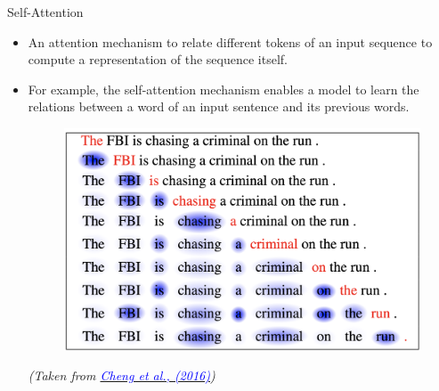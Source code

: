 \begin{frame}{Self-Attention}
\begin{itemize}
    \item  An attention mechanism to relate different tokens of an input sequence to compute a representation of the sequence itself. 
    \item For example, the self-attention mechanism enables a model to learn the relations between a word of an input sentence and its previous words. 
    \begin{figure}
        \centering
        \includegraphics[scale=0.2]{./figure/self_attention.png}
    \end{figure}
    
\vspace*{\fill}
\textit{\tiny{(Taken from 
\href{https://arxiv.org/pdf/1601.06733.pdf}{
\textcolor{blue}{Cheng et al., (2016)}}})}
\end{itemize}
\end{frame}


